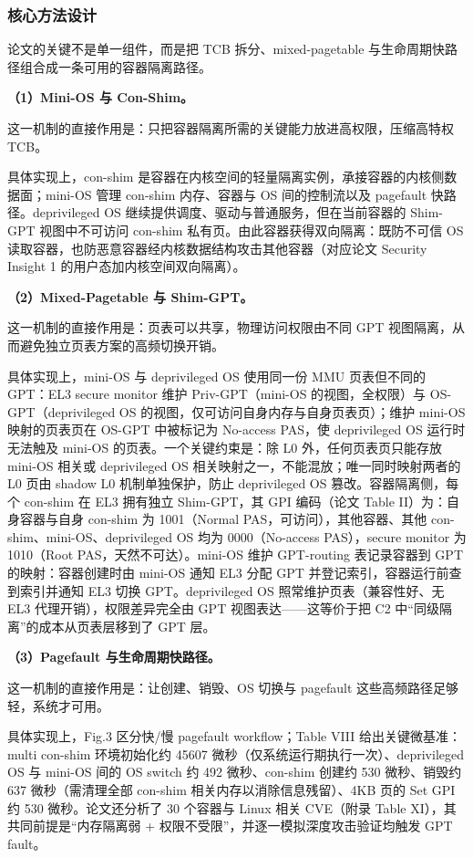 \documentclass[11pt]{ctexart}
\begin{document}
\subsubsection{核心方法设计}
论文的关键不是单一组件，而是把 TCB 拆分、mixed-pagetable 与生命周期快路径组合成一条可用的容器隔离路径。\par
\noindent\textbf{（1）Mini-OS 与 Con-Shim。}\par
这一机制的直接作用是：只把容器隔离所需的关键能力放进高权限，压缩高特权 TCB。\par
具体实现上，con-shim 是容器在内核空间的轻量隔离实例，承接容器的内核侧数据面；mini-OS 管理 con-shim 内存、容器与 OS 间的控制流以及 pagefault 快路径。deprivileged OS 继续提供调度、驱动与普通服务，但在当前容器的 Shim-GPT 视图中不可访问 con-shim 私有页。由此容器获得双向隔离：既防不可信 OS 读取容器，也防恶意容器经内核数据结构攻击其他容器（对应论文 Security Insight 1 的用户态加内核空间双向隔离）。\par
\noindent\textbf{（2）Mixed-Pagetable 与 Shim-GPT。}\par
这一机制的直接作用是：页表可以共享，物理访问权限由不同 GPT 视图隔离，从而避免独立页表方案的高频切换开销。\par
具体实现上，mini-OS 与 deprivileged OS 使用同一份 MMU 页表但不同的 GPT：EL3 secure monitor 维护 Priv-GPT（mini-OS 的视图，全权限）与 OS-GPT（deprivileged OS 的视图，仅可访问自身内存与自身页表页）；维护 mini-OS 映射的页表页在 OS-GPT 中被标记为 No-access PAS，使 deprivileged OS 运行时无法触及 mini-OS 的页表。一个关键约束是：除 L0 外，任何页表页只能存放 mini-OS 相关或 deprivileged OS 相关映射之一，不能混放；唯一同时映射两者的 L0 页由 shadow L0 机制单独保护，防止 deprivileged OS 篡改。容器隔离侧，每个 con-shim 在 EL3 拥有独立 Shim-GPT，其 GPI 编码（论文 Table II）为：自身容器与自身 con-shim 为 1001（Normal PAS，可访问），其他容器、其他 con-shim、mini-OS、deprivileged OS 均为 0000（No-access PAS），secure monitor 为 1010（Root PAS，天然不可达）。mini-OS 维护 GPT-routing 表记录容器到 GPT 的映射：容器创建时由 mini-OS 通知 EL3 分配 GPT 并登记索引，容器运行前查到索引并通知 EL3 切换 GPT。deprivileged OS 照常维护页表（兼容性好、无 EL3 代理开销），权限差异完全由 GPT 视图表达——这等价于把 C2 中“同级隔离”的成本从页表层移到了 GPT 层。\par
\noindent\textbf{（3）Pagefault 与生命周期快路径。}\par
这一机制的直接作用是：让创建、销毁、OS 切换与 pagefault 这些高频路径足够轻，系统才可用。\par
具体实现上，Fig.3 区分快/慢 pagefault workflow；Table VIII 给出关键微基准：multi con-shim 环境初始化约 45607 微秒（仅系统运行期执行一次）、deprivileged OS 与 mini-OS 间的 OS switch 约 492 微秒、con-shim 创建约 530 微秒、销毁约 637 微秒（需清理全部 con-shim 相关内存以消除信息残留）、4KB 页的 Set GPI 约 530 微秒。论文还分析了 30 个容器与 Linux 相关 CVE（附录 Table XI），其共同前提是“内存隔离弱 + 权限不受限”，并逐一模拟深度攻击验证均触发 GPT fault。\par
\end{document}
